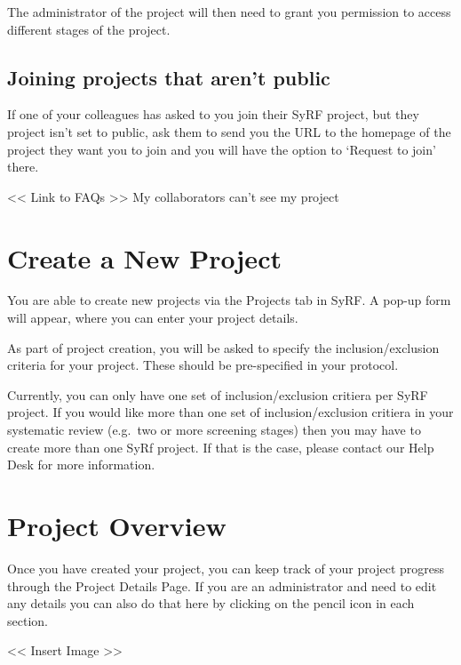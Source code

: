 \documentclass[
]{book}
\begin{document}
The administrator of the project will then need to grant you permission to access different stages of the project.

\hypertarget{joining-projects-that-arent-public}{%
\section{Joining projects that aren't public}\label{joining-projects-that-arent-public}}

If one of your colleagues has asked to you join their SyRF project, but they project isn't set to public, ask them to send you the URL to the homepage of the project they want you to join and you will have the option to `Request to join' there.

\textless{}\textless{} Link to FAQs \textgreater{}\textgreater{}
My collaborators can't see my project

\hypertarget{createProject}{%
\chapter{Create a New Project}\label{createProject}}

You are able to create new projects via the Projects tab in SyRF. A pop-up form will appear, where you can enter your project details.

As part of project creation, you will be asked to specify the inclusion/exclusion criteria for your project. These should be pre-specified in your protocol.

Currently, you can only have one set of inclusion/exclusion critiera per SyRF project. If you would like more than one set of inclusion/exclusion critiera in your systematic review (e.g.~two or more screening stages) then you may have to create more than one SyRf project. If that is the case, please contact our Help Desk for more information.

\hypertarget{projectOverview}{%
\chapter{Project Overview}\label{projectOverview}}

Once you have created your project, you can keep track of your project progress through the Project Details Page. If you are an administrator and need to edit any details you can also do that here by clicking on the pencil icon in each section.

\textless{}\textless{} Insert Image \textgreater{}\textgreater{}
\end{document}
